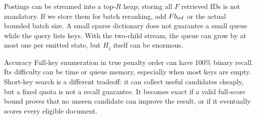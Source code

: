 Postings can be streamed into a top-$R$ heap; storing all $F$ retrieved IDs is not mandatory.
If we store them for batch reranking, add $F b_{\rm ref}$ or the actual bounded batch
size. A small sparse dictionary does not guarantee a small queue while the query lists keys. With the two-child stream, the queue can grow by at most one per emitted state, but
$H_j$ itself can be enormous.

\begin{resultbox}{Accuracy}
Full-key enumeration in true penalty order can have 100\% binary recall. Its difficulty can
be time or queue memory, especially when most keys are empty. Short-key search is a different
tradeoff: it can collect useful candidates cheaply, but a fixed quota is not a recall guarantee.
It becomes exact if a valid full-score bound proves that no unseen candidate can improve the
result, or if it eventually scores every eligible document.
\end{resultbox}
